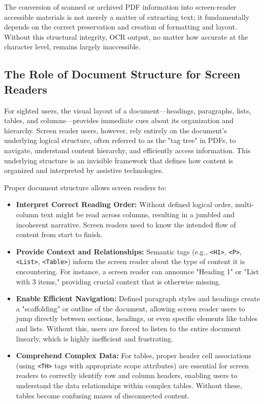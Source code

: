 The conversion of scanned or archived PDF information into screen-reader accessible materials is not merely a matter of extracting text; it fundamentally depends on the correct preservation and creation of formatting and layout. Without this structural integrity, OCR output, no matter how accurate at the character level, remains largely inaccessible.

\subsection{The Role of Document Structure for Screen Readers}

For sighted users, the visual layout of a document—headings, paragraphs, lists, tables, and columns—provides immediate cues about its organization and hierarchy. Screen reader users, however, rely entirely on the document's underlying logical structure, often referred to as the "tag tree" in PDFs, to navigate, understand content hierarchy, and efficiently access information. \cite{UWDocInfo,DevToPDFStructure} This underlying structure is an invisible framework that defines how content is organized and interpreted by assistive technologies.

Proper document structure allows screen readers to:

\begin{itemize}
    \item \textbf{Interpret Correct Reading Order:} Without defined logical order, multi-column text might be read across columns, resulting in a jumbled and incoherent narrative. \cite{UWDocInfo,DevToPDFStructure} Screen readers need to know the intended flow of content from start to finish. \cite{DevToPDFStructure,OITColoradoToolkit}
    \item \textbf{Provide Context and Relationships:} Semantic tags (e.g., \texttt{<H1>}, \texttt{<P>}, \texttt{<List>}, \texttt{<Table>}) inform the screen reader about the type of content it is encountering. \cite{UWDocInfo,DevToPDFStructure} For instance, a screen reader can announce "Heading 1" or "List with 3 items," providing crucial context that is otherwise missing. \cite{UWDocInfo,DevToPDFStructure}
    \item \textbf{Enable Efficient Navigation:} Defined paragraph styles and headings create a "scaffolding" or outline of the document, allowing screen reader users to jump directly between sections, headings, or even specific elements like tables and lists. \cite{UWDocInfo,DevToPDFStructure} Without this, users are forced to listen to the entire document linearly, which is highly inefficient and frustrating. \cite{DevToPDFStructure}
    \item \textbf{Comprehend Complex Data:} For tables, proper header cell associations (using \texttt{<TH>} tags with appropriate scope attributes) are essential for screen readers to correctly identify row and column headers, enabling users to understand the data relationships within complex tables. \cite{UWDocInfo,DevToPDFStructure} Without these, tables become confusing mazes of disconnected content. \cite{UWDocInfo,DevToPDFStructure}
\end{itemize}

